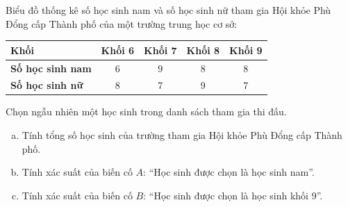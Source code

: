 \begin{bt}%
Biểu đồ thống kê số học sinh nam và số học sinh nữ tham gia Hội khỏe Phù Đổng cấp Thành phố của một trường trung học cơ sở:
	\begin{center}
		\begin{tabular}{|l|c|c|c|c|}
			\hline
			\textbf{Khối} & Khối 6 & Khối 7 & Khối 8 & Khối 9 \\
			\hline
			\textbf{Số học sinh nam} & 6 & 9 & 8 & 8 \\
			\hline
			\textbf{Số học sinh nữ} & 8 & 7 & 9 & 7 \\
			\hline
		\end{tabular}
	\end{center}
	Chọn ngẫu nhiên một học sinh trong danh sách tham gia thi đấu.
	\begin{enumerate}[a)]
		\item Tính tổng số học sinh của trường tham gia Hội khỏe Phù Đổng cấp Thành phố.
		\item Tính xác suất của biến cố $A$: ``Học sinh được chọn là học sinh nam''.
		\item Tính xác suất của biến cố $B$: ``Học sinh được chọn là học sinh khối 9''.
	\end{enumerate}
\end{bt}

